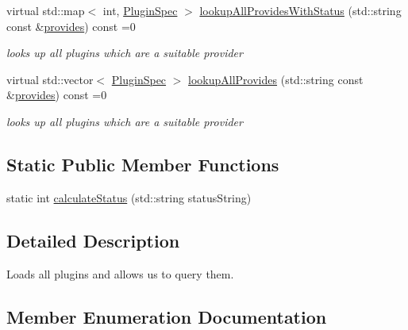 \begin{DoxyCompactItemize}
virtual std\+::map$<$ int, \mbox{\hyperlink{classkdb_1_1tools_1_1PluginSpec}{Plugin\+Spec}} $>$ \mbox{\hyperlink{classkdb_1_1tools_1_1PluginDatabase_aa918b547973f627a5604fa3b2b3faf30}{lookup\+All\+Provides\+With\+Status}} (std\+::string const \&\mbox{\hyperlink{classkdb_1_1tools_1_1PluginDatabase_afc91ff760616ee83c6afb70e5a2f0601a73ff10d6a07213c277db4326b3df6c4b}{provides}}) const =0
\begin{DoxyCompactList}\small\item\em looks up all plugins which are a suitable provider \end{DoxyCompactList}\item 
virtual std\+::vector$<$ \mbox{\hyperlink{classkdb_1_1tools_1_1PluginSpec}{Plugin\+Spec}} $>$ \mbox{\hyperlink{classkdb_1_1tools_1_1PluginDatabase_a3ed261ad8562c423b64cf34cbc086161}{lookup\+All\+Provides}} (std\+::string const \&\mbox{\hyperlink{classkdb_1_1tools_1_1PluginDatabase_afc91ff760616ee83c6afb70e5a2f0601a73ff10d6a07213c277db4326b3df6c4b}{provides}}) const =0
\begin{DoxyCompactList}\small\item\em looks up all plugins which are a suitable provider \end{DoxyCompactList}\end{DoxyCompactItemize}
\subsection*{Static Public Member Functions}
\begin{DoxyCompactItemize}
\item 
static int \mbox{\hyperlink{classkdb_1_1tools_1_1PluginDatabase_ab901b98a6c7661bbccffa8ab9ff62dc6}{calculate\+Status}} (std\+::string status\+String)
\end{DoxyCompactItemize}


\subsection{Detailed Description}
Loads all plugins and allows us to query them. 

\subsection{Member Enumeration Documentation}
\mbox{\label{classkdb_1_1tools_1_1PluginDatabase_afc91ff760616ee83c6afb70e5a2f0601}} 
